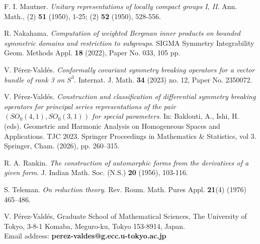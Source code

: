 \documentclass[12pt, pdflatex, a4paper]{article}
\theoremstyle{plain}
\theoremstyle{definition}
\begin{document}
\begin{thebibliography}{}
F. I. Mautner.
\textit{Unitary representations of locally compact groups I, II}.
Ann. Math., (2) \textbf{51} (1950), 1-25; (2) \textbf{52} (1950), 528-556.

R. Nakahama.
\textit{Computation of weighted Bergman inner products on bounded symmetric domains and restriction to subgroups}. SIGMA Symmetry Integrability Geom. Methods Appl. \textbf{18} (2022), Paper No. 033, 105 pp.

V. Pérez-Valdés.
\textit{Conformally covariant symmetry breaking operators for a vector bundle of rank 3 on $S^3$}. Internat. J. Math. \textbf{34} (2023) no. 12, Paper No. 2350072.

V. Pérez-Valdés.
\textit{Construction and classification of differential symmetry breaking operators for principal series representations of the pair $(SO_0(4,1), SO_0(3,1))$ for special parameters}. In: Baklouti, A., Ishi, H. (eds). Geometric and Harmonic Analysis on Homogeneous Spaces and Applications. TJC 2023. Springer Proceedings in Mathematics \& Statistics, vol 3. Springer, Cham. (2026), pp. 260--315.

R. A. Rankin.
\textit{The construction of automorphic forms from the derivatives of a given form}.
J. Indian Math. Soc. (N.S.) \textbf{20} (1956), 103-116.

S. Teleman.
\textit{On reduction theory}. Rev. Roum. Math. Pures Appl. \textbf{21}(4) (1976) 465--486.
\end{thebibliography}

\begin{flushleft}
V. Pérez-Valdés, Graduate School of Mathematical Sciences, The University of Tokyo, 3-8-1 Komaba, Meguro-ku, Tokyo 153-8914, Japan.\\
Email address: \textbf{perez-valdes@g.ecc.u-tokyo.ac.jp}
\end{flushleft}
\end{document}
